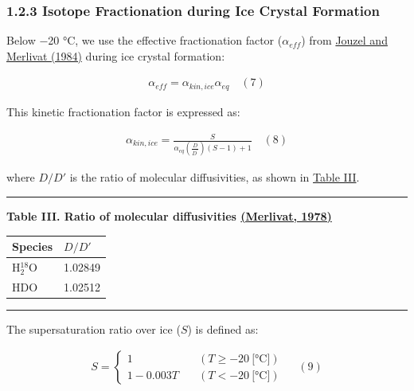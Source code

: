 \documentclass[11pt]{article}
\begin{document}
\subsubsection{1.2.3 Isotope Fractionation during Ice Crystal
Formation}\label{isotope-fractionation-during-ice-crystal-formation}

Below −20 °C, we use the effective fractionation factor (\(\alpha_{eff}\)) from
\hyperref[jouzel1984]{Jouzel and Merlivat (1984)} during ice crystal formation:

\[
\begin{array}{r}
\alpha_{eff} = \alpha_{kin,ice}\alpha_{eq} \quad (7)
\end{array}
\]

This kinetic fractionation factor is expressed as:

\[
\begin{array}{r}
\alpha_{kin,ice} = \frac{S}{\alpha_{eq}\left( \frac{D}{D^{'}} \right)(S - 1) + 1} \quad (8)
\end{array}
\]

where \(D/D'\) is the ratio of molecular diffusivities, as shown in \hyperref[Table-III]{Table III}.

\begin{center}\rule{0.5\linewidth}{0.5pt}\end{center}

\textbf{Table III. Ratio of molecular diffusivities \hyperref[merlivat1978]{(Merlivat, 1978)}}

\begin{longtable}[]{@{}ll@{}}
\toprule\noalign{}
Species & \(D/D'\) \\
\midrule\noalign{}
\endhead
\bottomrule\noalign{}
\endlastfoot
H\(_2^{18}\)O & 1.02849 \\
HDO & 1.02512 \\
\end{longtable}

\begin{center}\rule{0.5\linewidth}{0.5pt}\end{center}

The supersaturation ratio over ice (\(S\)) is defined as:

\[
\begin{array}{r}
S = \left\{ \begin{matrix}
1\quad & \left( T \geq - 20\ \text{[°C]} \right) \\
1 - 0.003T\quad & \left( T < - 20\ \text{[°C]} \right)
\end{matrix}\  \right. \quad (9)
\end{array}
\]
\end{document}
